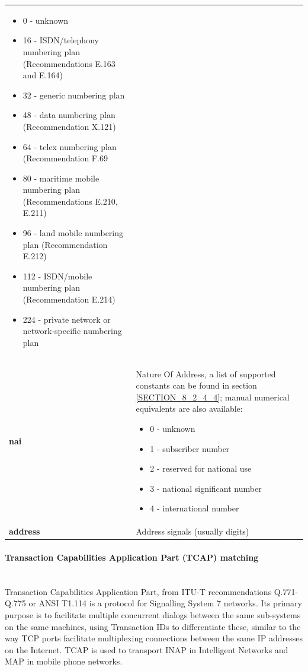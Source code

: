 \documentclass[a4paper,latin]{paper}
\begin{document}
\begin{tabularx}{\textwidth}{ | l | X |}
\begin{itemize}
							\setlength{\itemsep}{0pt}
							\setlength{\parskip}{0pt}
							\setlength{\parsep}{0pt} 
							\item 0 - unknown
							\item 16 - ISDN/telephony numbering plan (Recommendations E.163 and E.164)
							\item 32 - generic numbering plan
							\item 48 - data numbering plan (Recommendation X.121)
							\item 64 - telex numbering plan (Recommendation F.69
							\item 80 - maritime mobile numbering plan (Recommendations E.210, E.211)
							\item 96 - land mobile numbering plan (Recommendation E.212)
							\item 112 - ISDN/mobile numbering plan (Recommendation E.214)
							\item 224 - private network or network-specific numbering plan
						  \end{itemize} \\ 
	\textbf{nai}				& Nature Of Address, a list of supported constants can be found in
						  section \ref{SECTION_8_2_4_4}; manual numerical equivalents are also available: 
 						  \begin{itemize}
							\setlength{\itemsep}{0pt}
							\setlength{\parskip}{0pt}
							\setlength{\parsep}{0pt}
							\item 0 - unknown
							\item 1 - subscriber number
							\item 2 - reserved for national use
							\item 3 - national significant number
							\item 4 - international number
						  \end{itemize} \\ 
	\textbf{address}			& Address signals (usually digits) \\ 
	\hline
\end{tabularx}
\clearpage

\paragraph{Transaction Capabilities Application Part (TCAP) matching}
\mbox{}\\
Transaction Capabilities Application Part, from ITU-T recommendations Q.771-Q.775 or ANSI T1.114 is a protocol for Signalling System 7 networks. 
Its primary purpose is to facilitate multiple concurrent dialogs between the same sub-systems on the same machines, using Transaction IDs to differentiate 
these, similar to the way TCP ports facilitate multiplexing connections between the same IP addresses on the Internet. TCAP is used to transport INAP 
in Intelligent Networks and MAP in mobile phone networks.\\
\end{document}
